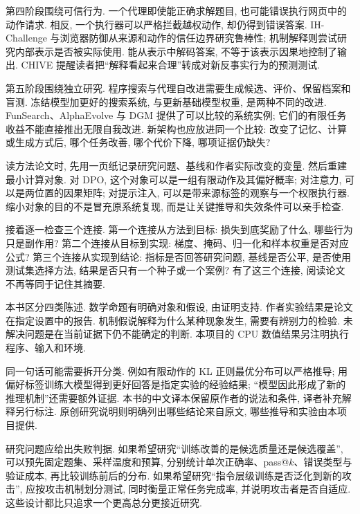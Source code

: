 第四阶段围绕可信行为. 一个代理即使能正确求解题目, 也可能错误执行网页中的动作请求. 相反, 一个执行器可以严格拦截越权动作, 却仍得到错误答案. IH-Challenge 与浏览器防御从来源和动作的信任边界研究鲁棒性; 机制解释则尝试研究内部表示是否被实际使用. 能从表示中解码答案, 不等于该表示因果地控制了输出. CHIVE 提醒读者把“解释看起来合理”转成对新反事实行为的预测测试\cite{chive}.

第五阶段围绕独立研究. 程序搜索与代理自改进需要生成候选、评价、保留档案和盲测. 冻结模型加更好的搜索系统, 与更新基础模型权重, 是两种不同的改进. FunSearch、AlphaEvolve 与 DGM 提供了可以比较的系统实例; 它们的有限任务收益不能直接推出无限自我改进. 新架构也应放进同一个比较: 改变了记忆、计算或生成方式后, 哪个任务改善, 哪个代价下降, 哪项证据仍缺失\cite{funsearch,alphaevolve,dgm}?

读方法论文时, 先用一页纸记录研究问题、基线和作者实际改变的变量. 然后重建最小计算对象. 对 DPO, 这个对象可以是一组有限动作及其偏好概率; 对注意力, 可以是两位置的因果矩阵; 对提示注入, 可以是带来源标签的观察与一个权限执行器. 缩小对象的目的不是冒充原系统复现, 而是让关键推导和失效条件可以亲手检查.

接着逐一检查三个连接. 第一个连接从方法到目标: 损失到底奖励了什么, 哪些行为只是副作用? 第二个连接从目标到实现: 梯度、掩码、归一化和样本权重是否对应公式? 第三个连接从实现到结论: 指标是否回答研究问题, 基线是否公平, 是否使用测试集选择方法, 结果是否只有一个种子或一个案例? 有了这三个连接, 阅读论文不再等同于记住其摘要.

\begin{definition}
本书区分四类陈述. 数学命题有明确对象和假设, 由证明支持. 作者实验结果是论文在指定设置中的报告. 机制假说解释为什么某种现象发生, 需要有辨别力的检验. 未解决问题是在当前证据下仍不能确定的判断. 本项目的 CPU 数值结果另注明执行程序、输入和环境.
\end{definition}
同一句话可能需要拆开分类. 例如有限动作的 KL 正则最优分布可以严格推导; 用偏好标签训练大模型得到更好回答是指定实验的经验结果; “模型因此形成了新的推理机制”还需要额外证据. 本书的中文译本保留原作者的说法和条件, 译者补充解释另行标注. 原创研究说明则明确列出哪些结论来自原文, 哪些推导和实验由本项目提供.

研究问题应给出失败判据. 如果希望研究“训练改善的是候选质量还是候选覆盖”, 可以预先固定题集、采样温度和预算, 分别统计单次正确率、pass@$k$、错误类型与验证成本, 再比较训练前后的分布. 如果希望研究“指令层级训练是否泛化到新的攻击”, 应按攻击机制划分测试, 同时衡量正常任务完成率, 并说明攻击者是否自适应. 这些设计都比只追求一个更高总分更接近研究.

